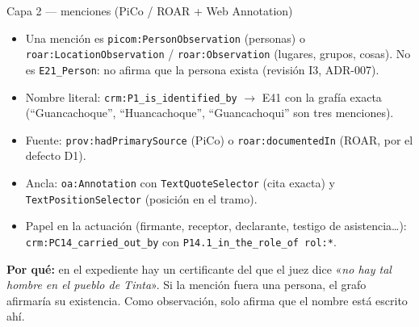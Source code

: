 \documentclass[aspectratio=169,10pt]{beamer}
\newcommand{\cita}[1]{«\textit{#1}»}
\newcommand{\ttt}[1]{\texttt{\small #1}}
\newcommand{\porque}[1]{\par\smallskip\colorbox{ocre!10}{\parbox{\dimexpr\linewidth-2\fboxsep}{\footnotesize\textbf{Por qué:} #1}}}
\begin{document}
\begin{frame}{Capa 2 — menciones (PiCo / ROAR + Web Annotation)}
\small
\begin{itemize}
\item Una mención es \ttt{picom:PersonObservation} (personas) o \ttt{roar:LocationObservation} /
      \ttt{roar:Observation} (lugares, grupos, cosas). \alert{No} es \ttt{E21\_Person}: no afirma que la persona exista
      (revisión I3, ADR-007).
\item Nombre literal: \ttt{crm:P1\_is\_identified\_by} $\to$ E41 con la grafía exacta (\enquote{Guancachoque},
      \enquote{Huancachoque}, \enquote{Guancachoqui} son tres menciones).
\item Fuente: \ttt{prov:hadPrimarySource} (PiCo) o \ttt{roar:documentedIn} (ROAR, por el defecto D1).
\item Ancla: \ttt{oa:Annotation} con \ttt{TextQuoteSelector} (cita exacta) y \ttt{TextPositionSelector} (posición en el
      tramo).
\item Papel en la actuación (firmante, receptor, declarante, testigo de asistencia…): \ttt{crm:PC14\_carried\_out\_by}
      con \ttt{P14.1\_in\_the\_role\_of rol:*}.
\end{itemize}
\porque{en el expediente hay un certificante del que el juez dice \cita{no hay tal hombre en el pueblo de Tinta}.
Si la mención fuera una persona, el grafo afirmaría su existencia. Como observación, solo afirma que el nombre está
escrito ahí.}
\end{frame}
\end{document}
